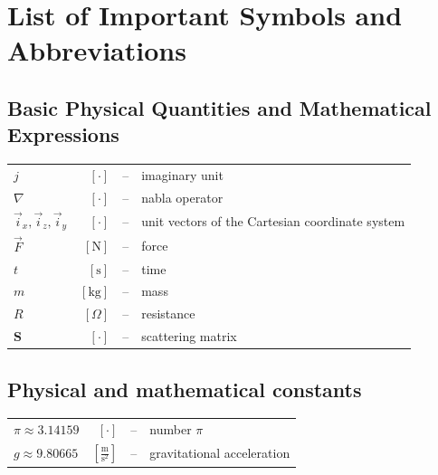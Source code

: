 
\chapter*{List of Important Symbols and Abbreviations}

\section*{Basic Physical Quantities and Mathematical Expressions}
\noindent
\begin{tabular}{l r c l}
     $j$  &$[\cdot]$  &--& imaginary unit\\
	 $\nabla$  &$[\cdot]$  &--& nabla operator\\
	 $\vec{i}_{x},\vec{i}_{z},\vec{i}_{y}$ &$[\cdot]$  &--& unit vectors of the Cartesian coordinate system\\
	 $\vec{F}$ &$[\text{N}]$   &--& force \\
	 $t$ &$[\text{s}]$  &--& time \\
	 $m$  &$[\text{kg}]$  &--& mass \\
	 $R$  &$[\Omega]$  &--& resistance\\
	 $\mathbf{S}$  &$[\cdot]$  &--& scattering matrix\\
\end{tabular}

\section*{Physical and mathematical constants}
\noindent
\begin{tabular}{l r c l}
	$\pi \approx 3.14159$ & $[\cdot]$  &--& number $\pi$\\ 
	$g \approx 9.80665$ & $[\frac{\text{m}}{\text{s}^2}]$  &--& gravitational acceleration\\
\end{tabular}

